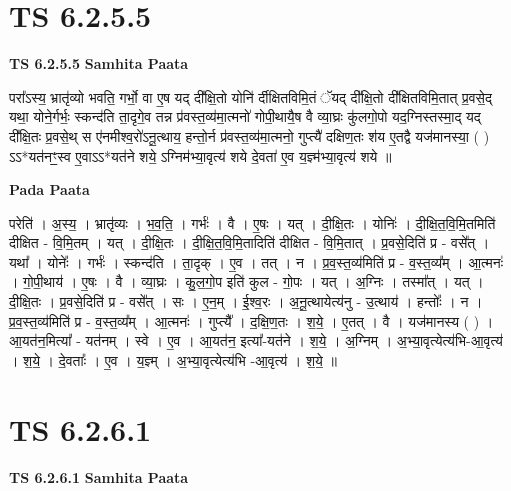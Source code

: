 \documentclass[17pt]{extarticle}
\begin{document}

\section{ TS 6.2.5.5 }

\textbf{TS 6.2.5.5 } \newline
\textbf{Samhita Paata} \newline

परा᳚ऽस्य॒ भ्रातृ॑व्यो भवति॒ गर्भो॒ वा ए॒ष यद् दी᳚क्षि॒तो योनि॑ र्दीक्षितविमि॒तं ॅयद् दी᳚क्षि॒तो दी᳚क्षितविमि॒तात् प्र॒वसे॒द् यथा॒ योने॒र्गर्भः॒ स्कन्द॑ति ता॒दृगे॒व तन्न प्र॑वस्त॒व्य॑मा॒त्मनो॑ गोपी॒थायै॒ष वै व्या॒घ्रः कु॑लगो॒पो यद॒ग्निस्तस्मा॒द् यद् दी᳚क्षि॒तः प्र॒वसे॒थ् स ए॑नमीश्व॒रो॑ऽनू॒त्थाय॒ हन्तो॒र्न प्र॑वस्त॒व्य॑मा॒त्मनो॒ गुप्त्यै॑ दक्षिण॒तः श॑य ए॒तद्वै यज॑मानस्या॒ ( ) ऽऽ*यत॑नꣳ॒॒स्व ए॒वाऽऽ*यत॑ने शये॒ ऽग्निम॑भ्या॒वृत्य॑ शये दे॒वता॑ ए॒व य॒ज्ञ्म॑भ्या॒वृत्य॑ शये ॥ \newline

\textbf{Pada Paata} \newline

परेति॑ । अ॒स्य॒ । भ्रातृ॑व्यः । भ॒व॒ति॒ । गर्भः॑ । वै । ए॒षः । यत् । दी॒क्षि॒तः । योनिः॑ । दी॒क्षि॒त॒वि॒मि॒तमिति॑ दीक्षित - वि॒मि॒तम् । यत् । दी॒क्षि॒तः । दी॒क्षि॒त॒वि॒मि॒तादिति॑ दीक्षित - वि॒मि॒तात् । प्र॒वसे॒दिति॑ प्र - वसे᳚त् । यथा᳚ । योनेः᳚ । गर्भः॑ । स्कन्द॑ति । ता॒दृक् । ए॒व । तत् । न । प्र॒व॒स्त॒व्य॑मिति॑ प्र - व॒स्त॒व्य᳚म् । आ॒त्मनः॑ । गो॒पी॒थाय॑ । ए॒षः । वै । व्या॒घ्रः । कु॒ल॒गो॒प इति॑ कुल - गो॒पः । यत् । अ॒ग्निः । तस्मा᳚त् । यत् । दी॒क्षि॒तः । प्र॒वसे॒दिति॑ प्र - वसे᳚त् । सः । ए॒न॒म् । ई॒श्व॒रः । अ॒नू॒त्थायेत्य॑नु - उ॒त्थाय॑ । हन्तोः᳚ । न । प्र॒व॒स्त॒व्य॑मिति॑ प्र - व॒स्त॒व्य᳚म् । आ॒त्मनः॑ । गुप्त्यै᳚ । द॒क्षि॒ण॒तः । श॒ये॒ । ए॒तत् । वै । यज॑मानस्य ( ) । आ॒यत॑न॒मित्या᳚ - यत॑नम् । स्वे । ए॒व । आ॒यत॑न॒ इत्या᳚-यत॑ने । श॒ये॒ । अ॒ग्निम् । अ॒भ्या॒वृत्येत्य॑भि-आ॒वृत्य॑ । श॒ये॒ । दे॒वताः᳚ । ए॒व । य॒ज्ञ्म् । अ॒भ्या॒वृत्येत्य॑भि -आ॒वृत्य॑ । श॒ये॒ ॥  \newline





\section{ TS 6.2.6.1 }

\textbf{TS 6.2.6.1 } \newline
\textbf{Samhita Paata} \newline
\end{document}
